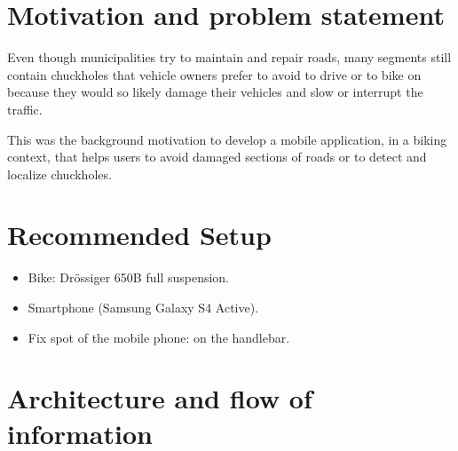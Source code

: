 \documentclass[10pt,a4paper]{article} %
\begin{document}
    \pagestyle{plain}
    \title{\rmfamily\normalfont{}}
    \author{}
    \date{} %
    
    \maketitle
    
 
\newpage
    \tableofcontents
\newpage    
    \section{Motivation and problem statement}



Even though municipalities try to maintain and repair roads, many segments still contain chuckholes that vehicle owners prefer to avoid to drive or to bike on because they would so likely damage their vehicles and slow or interrupt the traffic.

This was the background motivation to develop a mobile application, in a biking context, that helps users to avoid damaged sections of roads or to detect and localize chuckholes.

 
 
 
 
    \section{Recommended Setup}
	\begin{itemize} 
	\item Bike: Drössiger 650B full suspension.
	\item Smartphone (Samsung Galaxy S4 Active).
	\item Fix spot of the mobile phone: on the handlebar.
	
	
	\end{itemize}


    \section{Architecture and flow of information}
	
\end{document}
